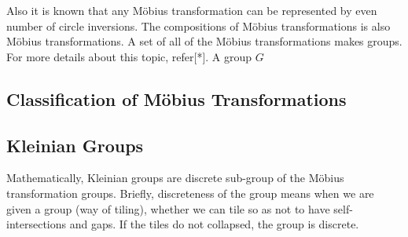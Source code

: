 Also it is known that any M\"obius transformation can be represented by 
even number of circle inversions.
The compositions of M\"obius transformations is also M\"obius
transformations. A set of all of the M\"obius transformations makes
groups. For more details about this topic, refer[*].
A group $G$









\subsection{Classification of M\"obius Transformations}

\subsection{Kleinian Groups}

Mathematically, Kleinian groups are discrete sub-group of the M\"obius
transformation groups.  Briefly, discreteness of the group means when we
are given a group (way of tiling), whether we can tile so as not to have
self-intersections and gaps.  If the tiles do not collapsed, the group
is discrete.

